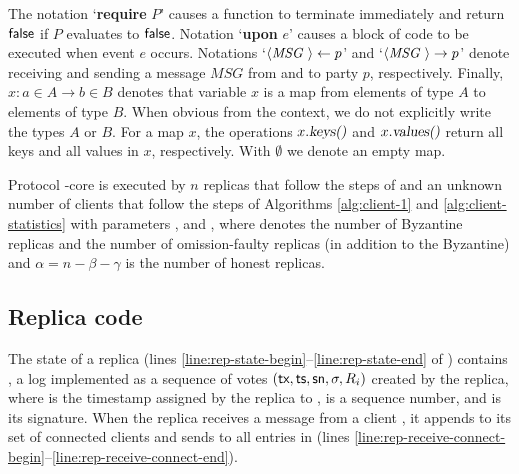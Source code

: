 The notation `\textbf{require} $P$' causes a function to terminate immediately and return $\mathsf{false}$ if $P$ evaluates to $\mathsf{false}$.
Notation `\textbf{upon} $e$' causes a block of code to be executed when event $e$ occurs.
Notations `$\msg{MSG}{} \leftarrow p$' and `$\msg{MSG}{} \rightarrow p$' denote receiving and sending a message $MSG$ from and to party $p$, respectively.
Finally, $x: a \in A \rightarrow b \in B$ denotes that variable $x$ is a map from elements of type $A$ to elements of type $B$. When obvious from the context, we do not explicitly write the types $A$ or $B$.
For a map $x$, the operations $x.\textsl{keys()}$ and $x.\textsl{values()}$ return all keys and all values in $x$, respectively.
With $\emptyset$ we denote an empty map.

\begin{protocol}\label{const:pod-core}
     Protocol \podtm-core is executed by $n$ replicas that follow the steps of  and an unknown number of clients that follow the steps of Algorithms \ref{alg:client-1} and \ref{alg:client-statistics} with parameters \beta, \gamma and \alpha, where \beta denotes the number of Byzantine replicas and \gamma the number of omission-faulty replicas (in addition to the Byzantine) and $\alpha = n - \beta - \gamma$ is the number of honest replicas.
\end{protocol}


\subsection{Replica code}



The state of a replica (lines \ref{line:rep-state-begin}--\ref{line:rep-state-end} of ) contains \repLog, a log implemented as a sequence of votes $(\textsf{tx}, \textsf{ts}, \textsf{sn}, \sigma, R_i)$ created by the replica, where \tsp is the timestamp assigned by the replica to \tx, \sn is a sequence number, and \sig is its signature.
When the replica receives a \msgconnect{} message from a client \client, it appends \client to its set of connected clients and sends to \client all entries in \repLog (lines \ref{line:rep-receive-connect-begin}--\ref{line:rep-receive-connect-end}).


